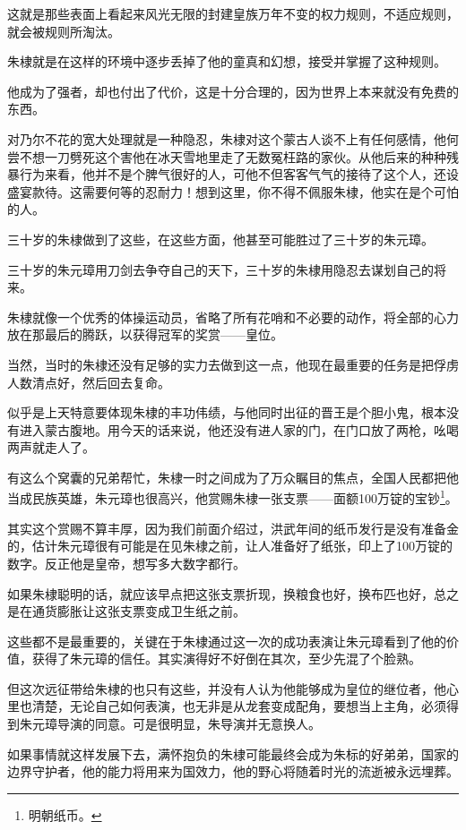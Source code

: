 \begin{multicols}{\theparacolNo}
		这就是那些表面上看起来风光无限的封建皇族万年不变的权力规则，不适应规则，就会被规则所淘汰。

		朱棣就是在这样的环境中逐步丢掉了他的童真和幻想，接受并掌握了这种规则。

		他成为了强者，却也付出了代价，这是十分合理的，因为世界上本来就没有免费的东西。

		对乃尔不花的宽大处理就是一种隐忍，朱棣对这个蒙古人谈不上有任何感情，他何尝不想一刀劈死这个害他在冰天雪地里走了无数冤枉路的家伙。从他后来的种种残暴行为来看，他并不是个脾气很好的人，可他不但客客气气的接待了这个人，还设盛宴款待。这需要何等的忍耐力！想到这里，你不得不佩服朱棣，他实在是个可怕的人。

		三十岁的朱棣做到了这些，在这些方面，他甚至可能胜过了三十岁的朱元璋。

		三十岁的朱元璋用刀剑去争夺自己的天下，三十岁的朱棣用隐忍去谋划自己的将来。

		朱棣就像一个优秀的体操运动员，省略了所有花哨和不必要的动作，将全部的心力放在那最后的腾跃，以获得冠军的奖赏——皇位。

		当然，当时的朱棣还没有足够的实力去做到这一点，他现在最重要的任务是把俘虏人数清点好，然后回去复命。

		似乎是上天特意要体现朱棣的丰功伟绩，与他同时出征的晋王是个胆小鬼，根本没有进入蒙古腹地。用今天的话来说，他还没有进人家的门，在门口放了两枪，吆喝两声就走人了。

		有这么个窝囊的兄弟帮忙，朱棣一时之间成为了万众瞩目的焦点，全国人民都把他当成民族英雄，朱元璋也很高兴，他赏赐朱棣一张支票——面额100万锭的宝钞\footnote{明朝纸币。}。

		其实这个赏赐不算丰厚，因为我们前面介绍过，洪武年间的纸币发行是没有准备金的，估计朱元璋很有可能是在见朱棣之前，让人准备好了纸张，印上了100万锭的数字。反正他是皇帝，想写多大数字都行。

		如果朱棣聪明的话，就应该早点把这张支票折现，换粮食也好，换布匹也好，总之是在通货膨胀让这张支票变成卫生纸之前。

		这些都不是最重要的，关键在于朱棣通过这一次的成功表演让朱元璋看到了他的价值，获得了朱元璋的信任。其实演得好不好倒在其次，至少先混了个脸熟。

		但这次远征带给朱棣的也只有这些，并没有人认为他能够成为皇位的继位者，他心里也清楚，无论自己如何表演，也无非是从龙套变成配角，要想当上主角，必须得到朱元璋导演的同意。可是很明显，朱导演并无意换人。

		如果事情就这样发展下去，满怀抱负的朱棣可能最终会成为朱标的好弟弟，国家的边界守护者，他的能力将用来为国效力，他的野心将随着时光的流逝被永远埋葬。


\end{multicols}
